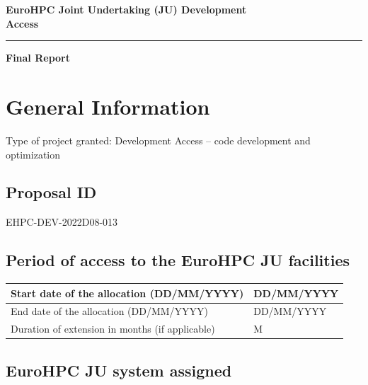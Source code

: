 \documentclass[a4paper,12pt]{article}
\makeatletter
\newif\ifshowinstructions
\newcommand{\instructions}[1]{\ifshowinstructions {\fontsize{10}{11}\selectfont \textit{#1}} \fi}
\newenvironment{jubox}
  {
    \begin{mdframed}
    \globalcolor{blue}
  }
  {
    \end{mdframed}
  }
\newcommand{\checkbox}[1]{%
  \ifthenelse{\equal{#1}{yes}}{$\boxtimes$}{$\Box$}%
}
\newcommand{\globalcolor}[1]{%
  \color{#1}\global\let\default@color\current@color
}
\makeatother
\begin{document}
{\fontsize{20}{32} \selectfont\textbf{EuroHPC Joint Undertaking (JU) Development \\Access}}
{\color{orng}\hrule height 1pt}
{\fontsize{20}{32} \selectfont\textbf{Final Report}}

\section{General Information}

Type of project granted: Development Access -- code development and optimization

\subsection{Proposal ID}

\instructions{Please fill in the information in the box below.}

\begin{jubox}
  EHPC-DEV-2022D08-013
\end{jubox}

\subsection{Period of access to the EuroHPC JU facilities}

\instructions{Please fill in the information in the box below.}

\begin{tabulary}{\textwidth}{|p{0.47\textwidth}|p{0.47\textwidth}|}
  \hline
  Start date of the allocation (DD/MM/YYYY) & DD/MM/YYYY \\
  \hline
  End date of the allocation (DD/MM/YYYY) & DD/MM/YYYY \\
  \hline
  Duration of extension in months (if applicable) & M \\
  \hline
\end{tabulary}

\subsection{EuroHPC JU system assigned}

\instructions{Plese click once in the box to select it, click again to unselect.}

\end{document}
